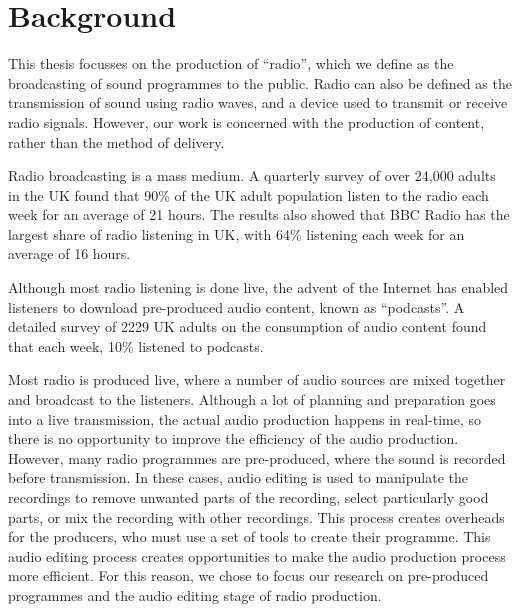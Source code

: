 \chapter{Background}\label{chp:background}



This thesis focusses on the production of ``radio'', which we define as the broadcasting of sound programmes to the
public.  Radio can also be defined as the transmission of sound using radio waves, and a device used to transmit or
receive radio signals.  However, our work is concerned with the production of content, rather than the method of
delivery.

Radio broadcasting is a mass medium.  A quarterly survey of over 24,000 adults in the UK \citep{RAJAR2017a} found that
90\% of the UK adult population listen to the radio each week for an average of 21 hours. The results also showed that
BBC Radio has the largest share of radio listening in UK, with 64\% listening each week for an average of 16 hours.

Although most radio listening is done live, the advent of the Internet has enabled listeners to download pre-produced
audio content, known as ``podcasts''. A detailed survey of 2229 UK adults on the consumption of audio content
\citep{RAJAR2017} found that each week, 10\% listened to podcasts. 

Most radio is produced live, where a number of audio sources are mixed together and broadcast to the listeners.
Although a lot of planning and preparation goes into a live transmission, the actual audio production happens in
real-time, so there is no opportunity to improve the efficiency of the audio production. However, many radio programmes
are pre-produced, where the sound is recorded before transmission.  In these cases, audio editing is used to manipulate
the recordings to remove unwanted parts of the recording, select particularly good parts, or mix the recording with
other recordings. This process creates overheads for the producers, who must use a set of tools to create their
programme. This audio editing process creates opportunities to make the audio production process more efficient. For
this reason, we chose to focus our research on pre-produced programmes and the audio editing stage of radio production.

